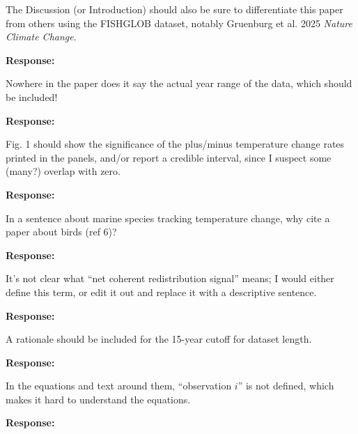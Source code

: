 \documentclass[11pt]{article}
\newcommand{\reviewer}[1]{\par\medskip\noindent\textcolor{revcolor}{#1}\par}
\newenvironment{reply}
{\par\smallskip\begingroup\color{replycolor}\noindent\textbf{Response:}\ }
{\endgroup\par\medskip}
\begin{document}
\reviewer{The Discussion (or Introduction) should also be sure to differentiate
this paper from others using the FISHGLOB dataset, notably Gruenburg et al. 2025
\textit{Nature Climate Change}.}

\begin{reply}

\end{reply}

\reviewer{Nowhere in the paper does it say the actual year range of the data, which
should be included!}

\begin{reply}

\end{reply}

\reviewer{Fig. 1 should show the significance of the plus/minus temperature change
rates printed in the panels, and/or report a credible interval, since I suspect
some (many?) overlap with zero.}

\begin{reply}

\end{reply}

\reviewer{In a sentence about marine species tracking temperature change, why cite a
paper about birds (ref 6)?}

\begin{reply}

\end{reply}

\reviewer{It's not clear what ``net coherent redistribution signal'' means; I would
either define this term, or edit it out and replace it with a descriptive sentence.}

\begin{reply}

\end{reply}

\reviewer{A rationale should be included for the 15-year cutoff for dataset length.}

\begin{reply}

\end{reply}

\reviewer{In the equations and text around them, ``observation $i$'' is not defined,
which makes it hard to understand the equations.}

\begin{reply}

\end{reply}
\end{document}
